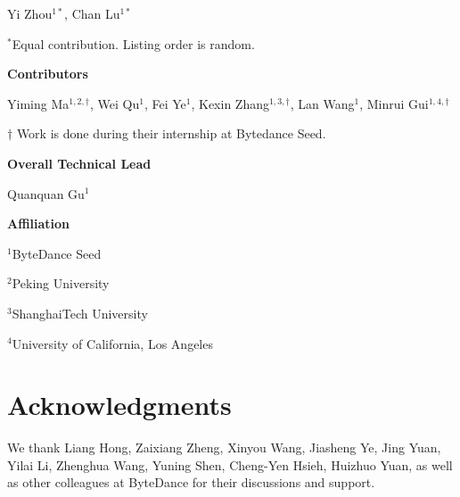 Yi Zhou$^{1*}$, Chan Lu$^{1*}$

$^{*}$Equal contribution. Listing order is random.

\textbf{Contributors}

Yiming Ma$^{1,2,\dagger}$, Wei Qu$^{1}$, Fei Ye$^{1}$, Kexin Zhang$^{1,3,\dagger}$, Lan Wang$^{1}$, Minrui Gui$^{1,4,\dagger}$

$\dagger$ Work is done during their internship at Bytedance Seed.

\textbf{Overall Technical Lead}

Quanquan Gu$^1$

\textbf{Affiliation}

$^1$ByteDance Seed

$^2$Peking University

$^3$ShanghaiTech University

$^4$University of California, Los Angeles

\section*{Acknowledgments}

We thank Liang Hong, Zaixiang Zheng, Xinyou Wang, Jiasheng Ye, Jing Yuan, Yilai Li, Zhenghua Wang, Yuning Shen, Cheng-Yen Hsieh, Huizhuo Yuan, as well as other colleagues at ByteDance for their discussions and support.